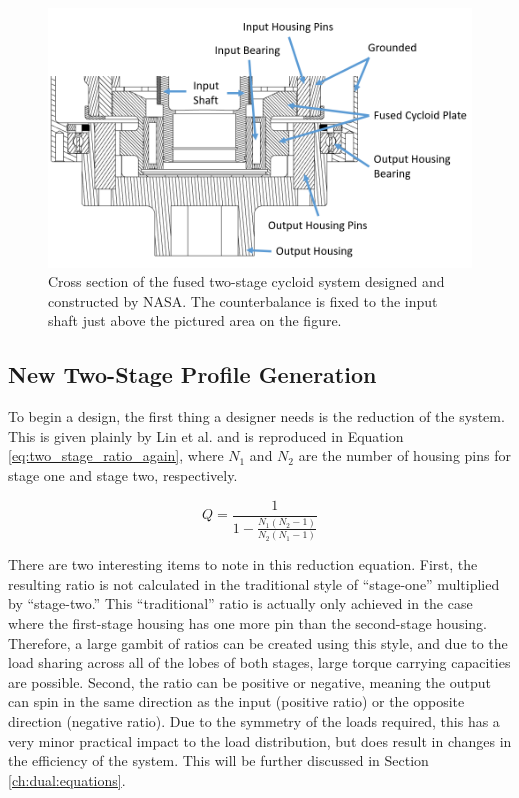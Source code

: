 \begin{figure}[!b]
	\centering
	\includegraphics[width=0.70\linewidth]{fig/two_stage_cross_section_labeled}
   \caption{Cross section of the fused two-stage cycloid system designed and constructed by NASA. The counterbalance is fixed to the input shaft just above the pictured area on the figure.}
   \label{fig:two_stage_design}
\end{figure}

\subsection{New Two-Stage Profile Generation} \label{ch:dual:initial_equation:profiles}

To begin a design, the first thing a designer needs is the reduction of the system. This is given plainly by Lin et al. and is reproduced in Equation \ref{eq:two_stage_ratio_again}, where $N_1$ and $N_2$ are the number of housing pins for stage one and stage two, respectively.

\begin{equation} \label{eq:two_stage_ratio_again}
Q = \frac{1}{1 - \frac{N_1 (N_2-1)}{N_2 (N_1-1)}}
\end{equation}

There are two interesting items to note in this reduction equation. First, the resulting ratio is not calculated in the traditional style of ``stage-one'' multiplied by ``stage-two.'' This ``traditional'' ratio is actually only achieved in the case where the first-stage housing has one more pin than the second-stage housing. Therefore, a large gambit of ratios can be created using this style, and due to the load sharing across all of the lobes of both stages, large torque carrying capacities are possible. Second, the ratio can be positive or negative, meaning the output can spin in the same direction as the input (positive ratio) or the opposite direction (negative ratio). Due to the symmetry of the loads required, this has a very minor practical impact to the load distribution, but does result in changes in the efficiency of the system. This will be further discussed in Section \ref{ch:dual:equations}. 

